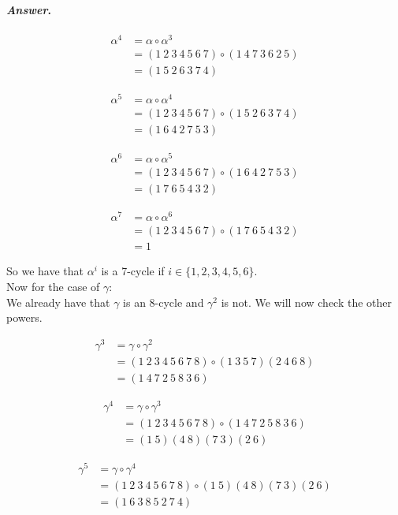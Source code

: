 \documentclass[11pt, reqno]{amsart}
\theoremstyle{plain}
\theoremstyle{definition}
\theoremstyle{example}
\newenvironment{ans}{\color{black}\medskip \paragraph*{\emph{Answer}.}}{\hfill \break  $~\!\!$ \dotfill \medskip }
\begin{document}
\begin{enumerate}[1.]
\begin{enumerate}
\begin{enumerate}
\begin{ans}
	\begin{align*}
	\alpha^4 &= \alpha \circ \alpha^3\\
	&= (1~2~3~4~5~6~7) \circ (1~4~7~3~6~2~5)\\
	&= (1~5~2~6~3~7~4)
	\end{align*}
	
	\begin{align*}
	\alpha^5 &= \alpha \circ \alpha^4\\
	&= (1~2~3~4~5~6~7) \circ (1~5~2~6~3~7~4)\\
	&= (1~6~4~2~7~5~3)
	\end{align*}
	
	\begin{align*}
	\alpha^6 &= \alpha \circ \alpha^5\\
	&= (1~2~3~4~5~6~7) \circ (1~6~4~2~7~5~3)\\
	&= (1~7~6~5~4~3~2)
	\end{align*}
	
	\begin{align*}
	\alpha^7 &= \alpha \circ \alpha^6\\
	&= (1~2~3~4~5~6~7) \circ (1~7~6~5~4~3~2)\\
	&= 1
	\end{align*}
	
	So we have that $\alpha^i$ is a 7-cycle if $i \in \{1, 2, 3, 4, 5, 6\}$.\\
	
	Now for the case of $\gamma$:\\
	
	We already have that $\gamma$ is an 8-cycle and $\gamma^2$ is not. We will now check the other powers.
	
	\begin{align*}
	\gamma^3 &= \gamma \circ \gamma^2\\
	&= (1~2~3~4~5~6~7~8) \circ (1~3~5~7)(2~4~6~8)\\
	&= (1~4~7~2~5~8~3~6)
	\end{align*}
	
	\begin{align*}
	\gamma^4 &= \gamma \circ \gamma^3\\
	&= (1~2~3~4~5~6~7~8) \circ (1~4~7~2~5~8~3~6)\\
	&= (1~5)(4~8)(7~3)(2~6)
	\end{align*}
	
	\begin{align*}
	\gamma^5 &= \gamma \circ \gamma^4\\
	&= (1~2~3~4~5~6~7~8) \circ (1~5)(4~8)(7~3)(2~6)\\
	&= (1~6~3~8~5~2~7~4)
	\end{align*}
	

\end{ans}
\end{enumerate}
\end{enumerate}
\end{enumerate}
\end{document}
